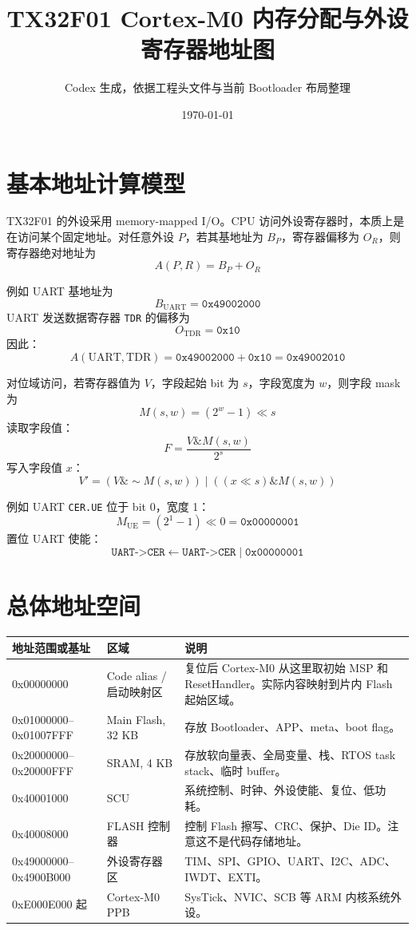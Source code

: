 \documentclass[UTF8,a4paper,11pt]{ctexart}
\title{TX32F01 Cortex-M0 内存分配与外设寄存器地址图}
\author{Codex 生成，依据工程头文件与当前 Bootloader 布局整理}
\date{\today}
\newcommand{\addr}[1]{\texttt{#1}}
\newcommand{\reg}[1]{\texttt{#1}}
\begin{document}
\maketitle

\section{基本地址计算模型}

TX32F01 的外设采用 memory-mapped I/O。CPU 访问外设寄存器时，本质上是在访问某个固定地址。对任意外设 $P$，若其基地址为 $B_P$，寄存器偏移为 $O_R$，则寄存器绝对地址为
\[
  A(P,R) = B_P + O_R
\]

例如 UART 基地址为
\[
  B_{\mathrm{UART}} = \addr{0x49002000}
\]
UART 发送数据寄存器 \reg{TDR} 的偏移为
\[
  O_{\mathrm{TDR}} = \addr{0x10}
\]
因此：
\[
  A(\mathrm{UART},\mathrm{TDR})
  = \addr{0x49002000} + \addr{0x10}
  = \addr{0x49002010}
\]

对位域访问，若寄存器值为 $V$，字段起始 bit 为 $s$，字段宽度为 $w$，则字段 mask 为
\[
  M(s,w) = \left(2^w - 1\right) \ll s
\]
读取字段值：
\[
  F = \frac{V \mathbin{\&} M(s,w)}{2^s}
\]
写入字段值 $x$：
\[
  V' = \left(V \mathbin{\&} \sim M(s,w)\right)
       \mathbin{|}
       \left((x \ll s) \mathbin{\&} M(s,w)\right)
\]

例如 UART \reg{CER.UE} 位于 bit 0，宽度 1：
\[
  M_{\mathrm{UE}} = (2^1 - 1) \ll 0 = \addr{0x00000001}
\]
置位 UART 使能：
\[
  \reg{UART->CER} \gets \reg{UART->CER} \mathbin{|} \addr{0x00000001}
\]

\section{总体地址空间}

\begin{longtable}{>{\ttfamily}p{3.1cm}p{4.1cm}p{7cm}}
\toprule
地址范围或基址 & 区域 & 说明 \\
\midrule
\endhead
0x00000000 & Code alias / 启动映射区 & 复位后 Cortex-M0 从这里取初始 MSP 和 ResetHandler。实际内容映射到片内 Flash 起始区域。\\
0x01000000--0x01007FFF & Main Flash, 32 KB & 存放 Bootloader、APP、meta、boot flag。\\
0x20000000--0x20000FFF & SRAM, 4 KB & 存放软向量表、全局变量、栈、RTOS task stack、临时 buffer。\\
0x40001000 & SCU & 系统控制、时钟、外设使能、复位、低功耗。\\
0x40008000 & FLASH 控制器 & 控制 Flash 擦写、CRC、保护、Die ID。注意这不是代码存储地址。\\
0x49000000--0x4900B000 & 外设寄存器区 & TIM、SPI、GPIO、UART、I2C、ADC、IWDT、EXTI。\\
0xE000E000 起 & Cortex-M0 PPB & SysTick、NVIC、SCB 等 ARM 内核系统外设。\\
\bottomrule
\end{longtable}
\end{document}
